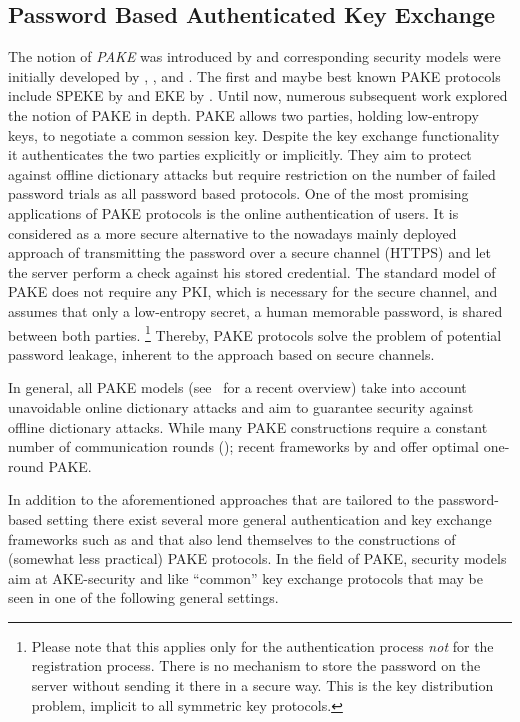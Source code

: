 \subsection{Password Based Authenticated Key Exchange}
The notion of \emph{\ac{PAKE}} was introduced by \citet{bellovin92} and corresponding security models were initially developed by \citet{Bellare2000}, \citet{Boyko2000}, and \citet{Goldreich01}.
The first and maybe best known \ac{PAKE} protocols include SPEKE by \citet{Jablon96} and EKE by \citet{bellovin92,Bellare2000}.
Until now, numerous subsequent work explored the notion of \acl{PAKE} in depth.
\ac{PAKE} allows two parties, holding low-entropy keys, to negotiate a common session key.
Despite the key exchange functionality it authenticates the two parties explicitly or implicitly.
They aim to protect against offline dictionary attacks but require restriction on the number of failed password trials as all password based protocols.
One of the most promising applications of \ac{PAKE} protocols is the online authentication of users.
It is considered as a more secure alternative to the nowadays mainly deployed approach of transmitting the password over a secure channel (\ac{HTTPS}) and let the server perform a check against his stored credential.
The standard model of \ac{PAKE} does not require any \ac{PKI}, which is necessary for the secure channel, and assumes that only a low-entropy secret, \ie a human memorable password, is shared between both parties.
\footnote{Please note that this applies only for the authentication process \emph{not} for the registration process.
There is no mechanism to store the password on the server without sending it there in a secure way.
This is the key distribution problem, implicit to all symmetric key protocols.}
Thereby, \ac{PAKE} protocols solve the problem of potential password leakage, inherent to the approach based on secure channels.

In general, all PAKE models (see~\citet{Pointcheval2012} for a recent overview) take into account unavoidable online dictionary attacks and aim to guarantee security against offline dictionary attacks.
While many PAKE constructions require a constant number of communication rounds (\citet{KatzOY01,Gennaro2003,Abdalla2005,Gennaro2008,Katz2009a,Katz2011}); recent frameworks by \citet{Katz2011} and \citet{Benhamouda2013} offer optimal one-round \ac{PAKE}.

In addition to the aforementioned approaches that are tailored to the password-based setting there exist several more general authentication and key exchange frameworks such as \citet{Camenisch2010} and \citet{Blazy2012} that also lend themselves to the constructions of (somewhat less practical) \ac{PAKE} protocols.
In the field of \acl{PAKE}, security models aim at \ac{AKE}-security \citet{Bellare1993} and \citet{Bellare1995} like ``common'' key exchange protocols that may be seen in one of the following general settings.

